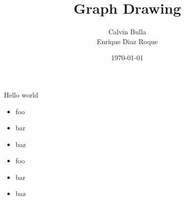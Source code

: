 \documentclass{beamer}
\title{Graph Drawing}
\date{\today}
\author{Calvin Bulla \\ Enrique Diaz Roque}
\institute{Randomized Algorithms}
\begin{document}
\begin{frame}{Hello world}
  \begin{minipage}{0.45\textwidth}
  \begin{itemize}
    \item foo
    \item bar
    \item baz
  \end{itemize}
  \end{minipage}
  \begin{minipage}{0.45\textwidth}
  \begin{itemize}
    \item foo
    \item bar
    \item baz
  \end{itemize}
  \end{minipage}
\end{frame}
\end{document}
